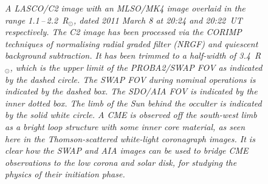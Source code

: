 \documentclass[preprint2]{aastex}
\begin{document}
\begin{figure}[!ht]
\caption{\itshape A LASCO/C2 image with an MLSO/MK4 image overlaid in the range 1.1\,--\,2.2~R$_\odot$, dated 2011 March 8 at 20:24 and 20:22~UT respectively. The C2 image has been processed via the CORIMP techniques of normalising radial graded filter (NRGF) and quiescent background subtraction. It has been trimmed to a half-width of 3.4~R$_\odot$, which is the upper limit of the PROBA2/SWAP FOV as indicated by the dashed circle. The SWAP FOV during nominal operations is indicated by the dashed box. The SDO/AIA FOV is indicated by the inner dotted box. The limb of the Sun behind the occulter is indicated by the solid white circle. A CME is observed off the south-west limb as a bright loop structure with some inner core material, as seen here in the Thomson-scattered white-light coronagraph images. It is clear how the SWAP and AIA images can be used to bridge CME observations to the low corona and solar disk, for studying the physics of their initiation phase.}
\label{overlays}
\end{figure}
\end{document}
